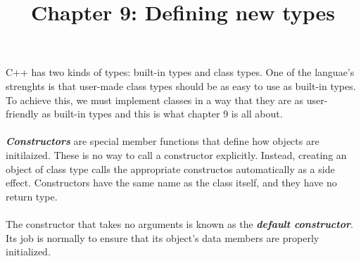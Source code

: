 \documentclass[12p,a4paper]{article}
\title{Chapter 9: Defining new types}
\begin{document}
\maketitle
C++ has two kinds of types: built-in types and class types. One of the languae's strenghts is that user-made class types should be as easy to use as built-in types. To achieve this, we must implement classes in a way that they are as user-friendly as built-in types and this is what chapter 9 is all about. \\
\\

\textbf{\textit{Constructors}} are special member functions that define how objects are initilaized. These is no way to call a constructor explicitly. Instead, creating an object of class type calls the appropriate constructos automatically as a side effect. Constructors have the same name as the class itself, and they have no return type. \\
\\

The constructor that takes no arguments is known as the \textbf{\textit{default constructor}}. Its job is normally to ensure that its object's data members are properly initialized. \\
\\
\end{document}
